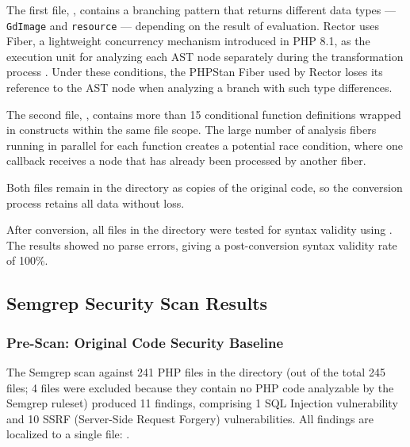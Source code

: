 The first file, \texttt{}, contains a branching pattern that returns different data types — \texttt{GdImage} and \texttt{resource} — depending on the result of \texttt{} evaluation. Rector uses Fiber, a lightweight concurrency mechanism introduced in PHP 8.1, as the execution unit for analyzing each AST node separately during the transformation process \cite{phpgroup2022supported}. Under these conditions, the PHPStan Fiber used by Rector loses its reference to the AST node when analyzing a branch with such type differences.

The second file, \texttt{}, contains more than 15 conditional function definitions wrapped in \texttt{} constructs within the same file scope. The large number of analysis fibers running in parallel for each function creates a potential race condition, where one callback receives a node that has already been processed by another fiber.

Both files remain in the \texttt{} directory as copies of the original code, so the conversion process retains all data without loss.

After conversion, all files in the \texttt{} directory were tested for syntax validity using \texttt{}. The results showed no parse errors, giving a post-conversion syntax validity rate of 100\%.

\subsection{Semgrep Security Scan Results}

\subsubsection{Pre-Scan: Original Code Security Baseline}

The Semgrep scan against 241 PHP files in the \texttt{} directory (out of the total 245 files; 4 files were excluded because they contain no PHP code analyzable by the Semgrep ruleset) produced 11 findings, comprising 1 SQL Injection vulnerability and 10 SSRF (Server-Side Request Forgery) vulnerabilities. All findings are localized to a single file: \texttt{}.

